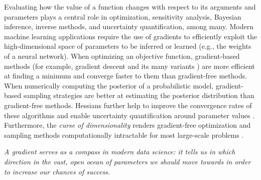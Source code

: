 Evaluating how the value of a function changes with respect to its arguments and parameters plays a central role in optimization, sensitivity analysis, Bayesian inference, inverse methods, and uncertainty quantification, among many\cite{Razavi.2021}. 
Modern machine learning applications require the use of gradients to efficiently exploit the high-dimensional space of parameters to be inferred or learned (e.g., the weights of a neural network). 
When optimizing an objective function, gradient-based methods (for example, gradient descent and its many variants \cite{ruder2016overview-gradient-descent}) are more efficient at finding a minimum and converge faster to them than gradient-free methods.
When numerically computing the posterior of a probabilistic model, gradient-based sampling strategies are better at estimating the posterior distribution than gradient-free methods. 
Hessians further help to improve the convergence rates of these algorithms and enable uncertainty quantification around parameter values \cite{BuiThanh:2012ul}.
Furthermore, the \textit{curse of dimensionality} renders gradient-free optimization and sampling methods computationally intractable for most large-scale problems \cite{Oden:2010tv}.
\begin{displayquote}
\emph{A gradient serves as a compass in modern data science: it tells us in which direction in the vast, open ocean of parameters we should move towards in order to increase our chances of success.  }
\end{displayquote}

